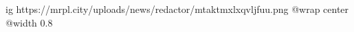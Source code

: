  
 
 
 
 

\ifcmt
  ig https://mrpl.city/uploads/news/redactor/mtaktmxlxqvljfuu.png
  @wrap center
  @width 0.8
\fi
